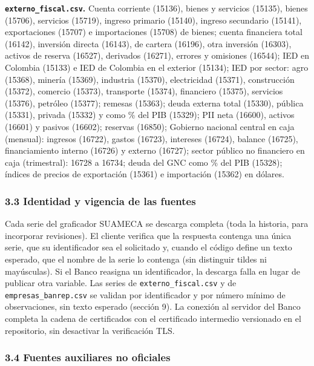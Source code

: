 \textbf{\texttt{externo\_fiscal.csv}.} Cuenta corriente (15136), bienes
y servicios (15135), bienes (15706), servicios (15719), ingreso primario
(15140), ingreso secundario (15141), exportaciones (15707) e
importaciones (15708) de bienes; cuenta financiera total (16142),
inversión directa (16143), de cartera (16196), otra inversión (16303),
activos de reserva (16527), derivados (16271), errores y omisiones
(16544); IED en Colombia (15133) e IED de Colombia en el exterior
(15134); IED por sector: agro (15368), minería (15369), industria
(15370), electricidad (15371), construcción (15372), comercio (15373),
transporte (15374), financiero (15375), servicios (15376), petróleo
(15377); remesas (15363); deuda externa total (15330), pública (15331),
privada (15332) y como \% del PIB (15329); PII neta (16600), activos
(16601) y pasivos (16602); reservas (16850); Gobierno nacional central
en caja (mensual): ingresos (16722), gastos (16723), intereses (16724),
balance (16725), financiamiento interno (16726) y externo (16727);
sector público no financiero en caja (trimestral): 16728 a 16734; deuda
del GNC como \% del PIB (15328); índices de precios de exportación
(15361) e importación (15362) en dólares.

\hypertarget{identidad-y-vigencia-de-las-fuentes}{%
\subsubsection{3.3 Identidad y vigencia de las
fuentes}\label{identidad-y-vigencia-de-las-fuentes}}

Cada serie del graficador SUAMECA se descarga completa (toda la
historia, para incorporar revisiones). El cliente verifica que la
respuesta contenga una única serie, que su identificador sea el
solicitado y, cuando el código define un texto esperado, que el nombre
de la serie lo contenga (sin distinguir tildes ni mayúsculas). Si el
Banco reasigna un identificador, la descarga falla en lugar de publicar
otra variable. Las series de \texttt{externo\_fiscal.csv} y de
\texttt{empresas\_banrep.csv} se validan por identificador y por número
mínimo de observaciones, sin texto esperado (sección 9). La conexión al
servidor del Banco completa la cadena de certificados con el certificado
intermedio versionado en el repositorio, sin desactivar la verificación
TLS.

\hypertarget{fuentes-auxiliares-no-oficiales}{%
\subsubsection{3.4 Fuentes auxiliares no
oficiales}\label{fuentes-auxiliares-no-oficiales}}


